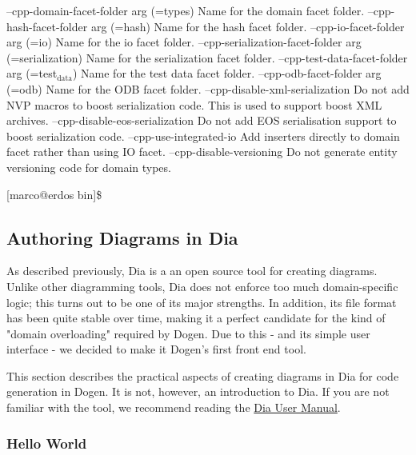 \documentclass[11pt]{article}
\begin{document}
--cpp-domain-facet-folder arg (=types)
                                      Name for the domain facet folder.
--cpp-hash-facet-folder arg (=hash)   Name for the hash facet folder.
--cpp-io-facet-folder arg (=io)       Name for the io facet folder.
--cpp-serialization-facet-folder arg (=serialization)
                                      Name for the serialization facet
                                      folder.
--cpp-test-data-facet-folder arg (=test$_{\text{data}}$)
                                      Name for the test data facet folder.
--cpp-odb-facet-folder arg (=odb)     Name for the ODB facet folder.
--cpp-disable-xml-serialization       Do not add NVP macros to boost
                                      serialization code. This is used to
                                      support boost XML archives.
--cpp-disable-eos-serialization       Do not add EOS serialisation support to
                                      boost serialization code.
--cpp-use-integrated-io               Add inserters directly to domain facet
                                      rather than using IO facet.
--cpp-disable-versioning              Do not generate entity versioning code
                                      for domain types.

[marco@erdos bin]\$

\subsection{Authoring Diagrams in Dia}
\label{sec-3-4}

As described previously, Dia is a an open source tool for creating
diagrams. Unlike other diagramming tools, Dia does not enforce too
much domain-specific logic; this turns out to be one of its major
strengths. In addition, its file format has been quite stable over
time, making it a perfect candidate for the kind of "domain
overloading" required by Dogen. Due to this - and its simple user
interface - we decided to make it Dogen's first front end tool.

This section describes the practical aspects of creating diagrams in
Dia for code generation in Dogen. It is not, however, an introduction
to Dia. If you are not familiar with the tool, we recommend reading
the \href{http://dia-installer.de/doc/en/}{Dia User Manual}.

\subsubsection{Hello World}
\label{sec-3-4-1}
\end{document}
